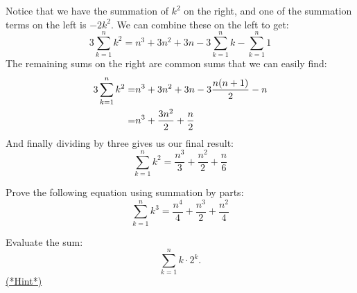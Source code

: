 Notice that we have the summation of $k^2$ on the right, and one of the summation terms on the left is $-2k^2$.  We can combine these on the left to get:
\[ 3 \sum_{k=1}^n k^2 =n^3 + 3n^2 + 3n - 3\sum_{k=1}^n k - \sum_{k=1}^n 1 \]
The remaining sums on the right are common sums that we can easily find:
\begin{align}
3 \sum_{k=1}^n k^2 =& n^3 + 3n^2 + 3n - 3\frac{n(n+1)}{2} - n \notag\\
=& n^3 + \frac{3n^2}{2} + \frac{n}{2} \notag
\end{align}
And finally dividing by three gives us our final result:
\[ \sum_{k=1}^n k^2 = \frac{n^3}{3} + \frac{n^2}{2} + \frac{n}{6} \]

\begin{exercise}
Prove the following equation using summation by parts:
\[ \sum_{k=1}^n k^3 = \frac{n^4}{4} + \frac{n^3}{2} + \frac{n^2}{4} \]
\end{exercise}

\begin{exercise}\label{exercise:Sigma:last} Evaluate the sum: 
\[\sum_{k=1}^n k \cdot 2^k.\]
\hyperref[sec:sigma:hints]{(*Hint*)} 
\end{exercise}